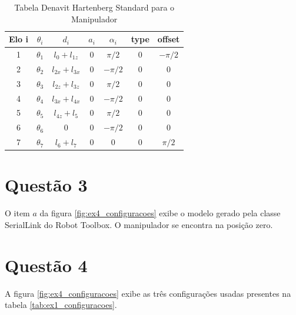 \documentclass[a4paper,11pt]{article}
\theoremstyle{mytheor}
\begin{document}
\begin{table}[!ht]
\centering
\caption{Tabela Denavit Hartenberg Standard para o Manipulador}
\label{tab:ex2_param_tabela_dh}
\begin{tabular}{|c|c|c|c|c|c|c|}
\hline
\textbf{Elo i} & \textbf{$\theta_i$} & \textbf{$d_i$} & \textbf{$a_i$} & \textbf{$\alpha_i$} & \textbf{type} & \textbf{offset} \\ \hline
1                & $\theta_1$            & $l_{0} + l_{1z}$     & $0$         & $\pi/2$               & $0$             & $-\pi/2$           \\ \hline
2                & $\theta_2$            & $l_{2x} + l_{3x}$    & $0$         & $-\pi/2$              & $0$             & $0$           \\ \hline
3                & $\theta_3$            & $l_{2z} + l_{3z}$    & $0$         & $\pi/2$               & $0$             & $0$               \\ \hline
4                & $\theta_4$            & $l_{3x} + l_{4x}$    & $0$         & $-\pi/2$              & $0$             & $0$               \\ \hline
5                & $\theta_5$            & $l_{4z} + l_{5}$     & $0$         & $\pi/2$               & $0$             & $0$               \\ \hline
6                & $\theta_6$            & $0$                  & $0$         & $-\pi/2$              & $0$             & $0$           \\ \hline
7                & $\theta_7$            & $l_6+l_7$            & $0$         & $0$                   & $0$             & $\pi/2$           \\ \hline
\end{tabular}
\end{table}



\section*{Questão 3}

O item $a$ da figura \ref{fig:ex4_configuracoes} exibe o modelo gerado pela classe SerialLink do Robot Toolbox. O manipulador se encontra na posição zero.

\section*{Questão 4}

A figura \ref{fig:ex4_configuracoes} exibe as três configurações usadas presentes na tabela \ref{tab:ex1_configuracoes}.
\end{document}
